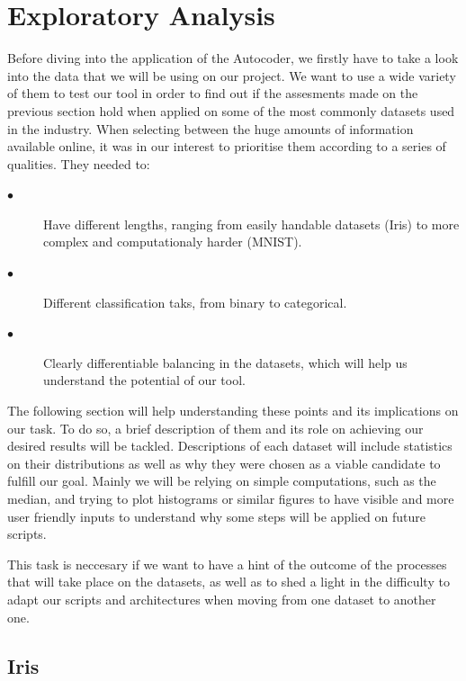 \label{chap:Develop}
\section{Exploratory Analysis}

Before diving into the application of the Autocoder, we firstly have to take a look into the data that we will be using on our project. We want to use a wide variety of them to test our tool in order to find out if the assesments made on the previous section hold when applied on some of the most commonly datasets used in the industry. When selecting between the huge amounts of information available online, it was in our interest to prioritise them according to a series of qualities. They needed to:
 
\begin{description}
	
\item[$\bullet$] Have different lengths, ranging from easily handable datasets (Iris) to more complex and computationaly harder (MNIST).

\item[$\bullet$] Different classification taks, from binary to categorical.

\item[$\bullet$] Clearly differentiable balancing in the datasets, which will help us understand the potential of our tool.

\end{description}

The following section will help understanding these points and its implications on our task. To do so, a brief description of them and its role on achieving our desired results will be tackled. Descriptions of each dataset will include statistics on their distributions as well as why they were chosen as a viable candidate to fulfill our goal. Mainly we will be relying on simple computations, such as the median, and trying to plot histograms or similar figures to have visible and more user friendly inputs to understand why some steps will be applied on future scripts.\par
 
This task is neccesary if we want to have a hint of the outcome of the processes that will take place on the datasets, as well as to shed a light in the difficulty to adapt our scripts and architectures when moving from one dataset to another one.

 

\subsection{Iris}

